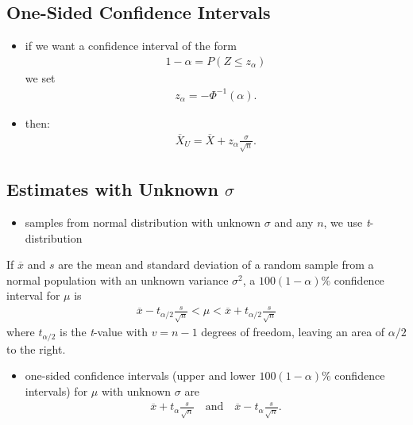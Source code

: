 \documentclass[10pt]{article}
\begin{document}
\subsection{One-Sided Confidence Intervals}
\begin{itemize}
    \item if we want a confidence interval of the form
        \begin{gather*}
            1-\alpha = P(Z \le z_\alpha)
        \end{gather*}
        we set
        \begin{gather*}
            z_\alpha = -\Phi^{-1}(\alpha)
        .\end{gather*}
    \item then:
        \begin{gather*}
            \overline{X}_U = \overline{X} + z_\alpha \frac{\sigma}{\sqrt{n} }
        .\end{gather*}
\end{itemize}

\subsection{Estimates with Unknown $\sigma$}
\begin{itemize}
    \item samples from normal distribution with unknown $\sigma$ and any $n$, we use \textit{t}-distribution
\end{itemize}
\begin{theorem}
    If $\overline{x}$ and $s$ are the mean and standard deviation of a random sample from a normal population with an unknown variance $\sigma^2$, a $100(1-\alpha)\%$ confidence interval for $\mu$ is
    \begin{gather*}
        \overline{x}-t_{\alpha / 2} \frac{s}{\sqrt{n} } < \mu < \overline{x}+t_{\alpha / 2} \frac{s}{\sqrt{n} }
    \end{gather*}
    where $t_{\alpha / 2}$ is the \textit{t}-value with $v=n-1$ degrees of freedom, leaving an area of $\alpha / 2$ to the right.
\end{theorem}
\begin{itemize}
    \item one-sided confidence intervals (upper and lower $100(1-\alpha)\%$ confidence intervals) for $\mu$ with unknown $\sigma$ are
        \begin{gather*}
            \overline{x}+t_{\alpha} \frac{s}{\sqrt{n} } \quad \text{and} \quad \overline{x}-t_{\alpha} \frac{s}{\sqrt{n} }
        .\end{gather*}
\end{itemize}
\end{document}
